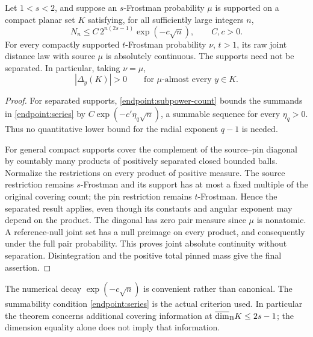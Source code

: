 \begin{theorem}
\label{endpoint:subpower}
Let \(1<s<2\), and suppose an \(s\)-Frostman probability \(\mu\)
is supported on a compact planar set \(K\) satisfying, for all
sufficiently large integers \(n\),
\begin{equation}\label{endpoint:subpower-count}
 N_n\le C\,2^{n(2s-1)}\exp(-c\sqrt n),\qquad C,c>0.
\end{equation}
For every compactly supported \(t\)-Frostman probability \(\nu\),
\(t>1\), its raw joint distance law with source \(\mu\) is absolutely
continuous. The supports need not be separated. In particular, taking
\(\nu=\mu\),
\[
 |\Delta_y(K)|>0\qquad\text{for \(\mu\)-almost every }y\in K.
\]
\end{theorem}

\begin{proof}
For separated supports, \eqref{endpoint:subpower-count} bounds the
summands in \eqref{endpoint:series} by
\(C\exp(-c'\eta_q\sqrt n)\), a summable sequence for
every \(\eta_q>0\). Thus no quantitative lower bound for the radial
exponent \(q-1\) is needed.

For general compact supports cover the complement of the source--pin
diagonal by countably many products of positively separated closed bounded
balls. Normalize the restrictions on every product of positive measure.
The source restriction remains \(s\)-Frostman and its support has at most
a fixed multiple of the original covering count; the pin restriction
remains \(t\)-Frostman. Hence the separated result applies, even though
its constants and angular exponent may depend on the product. The diagonal
has zero pair measure since \(\mu\) is nonatomic. A reference-null joint
set has a null preimage on every product, and consequently under the full
pair probability. This proves joint absolute continuity without separation.
Disintegration and the positive total pinned mass give the final assertion.
\end{proof}

The numerical decay \(\exp(-c\sqrt n)\) is convenient rather than
canonical. The summability condition \eqref{endpoint:series} is the actual
criterion used. In particular the theorem concerns additional covering
information at \(\overline{\dim}_{\rm B}K\le2s-1\); the dimension
equality alone does not imply that information.
